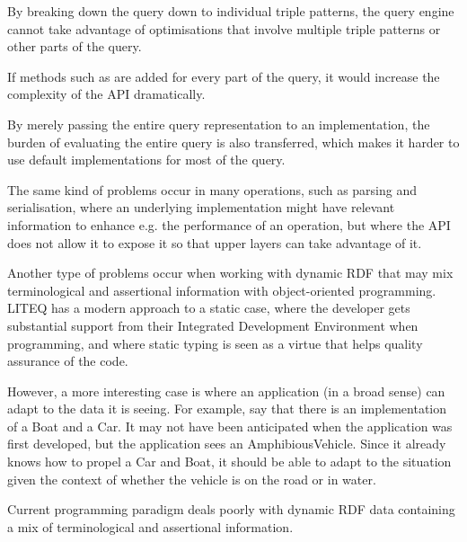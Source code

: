 \begin{problem}
By breaking down the query down to individual triple patterns, the
query engine cannot take advantage of optimisations that involve
multiple triple patterns or other parts of the query.
\end{problem}

\begin{problem}
If methods such as  are added for every part of the
query, it would increase the complexity of the API dramatically.
\end{problem}

\begin{problem}
By merely passing the entire query representation to an
implementation, the burden of evaluating the entire query is also
transferred, which makes it harder to use default implementations for
most of the query.
\end{problem}

The same kind of problems occur in many operations, such as parsing
and serialisation, where an underlying implementation might have
relevant information to enhance e.g. the performance of an operation,
but where the API does not allow it to expose it so that upper layers
can take advantage of it.

Another type of problems occur when working with dynamic RDF that may
mix terminological and assertional information with object-oriented
programming. LITEQ \cite{leinberger2014semantic} has a modern approach
to a static case, where the developer gets substantial support from
their Integrated Development Environment when programming, and where
static typing is seen as a virtue that helps quality assurance of the
code.

However, a more interesting case is where an application (in a broad
sense) can adapt to the data it is seeing. For example, say that there
is an implementation of a Boat and a Car. It may not have been
anticipated when the application was first developed, but the
application sees an AmphibiousVehicle. Since it already knows how to
propel a Car and Boat, it should be able to adapt to the situation
given the context of whether the vehicle is on the road or in water.

\begin{problem}
Current programming paradigm deals poorly with dynamic RDF data
containing a mix of terminological and assertional information.
\end{problem}
